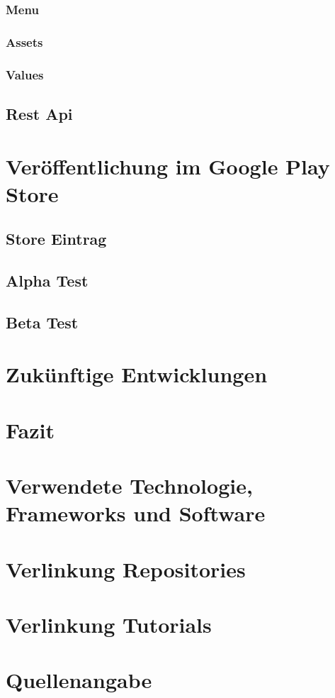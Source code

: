 \documentclass{scrartcl}
\begin{document}
\subsubsection{Menu}

\subsubsection{Assets}

\subsubsection{Values}

\subsection{Rest Api}


\newpage

\section{Veröffentlichung im Google Play Store}

\subsection{Store Eintrag}

\subsection{Alpha Test}

\subsection{Beta Test}


\newpage

\section{Zukünftige Entwicklungen}


\newpage

\section{Fazit}


\newpage

\section{Verwendete Technologie, Frameworks und Software}


\newpage

\section{Verlinkung Repositories}


\newpage

\section{Verlinkung Tutorials}


\newpage

\section{Quellenangabe}
\end{document}
